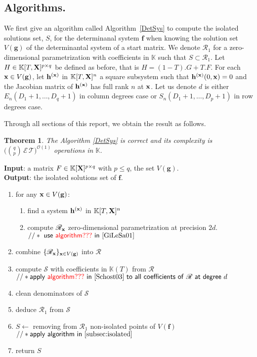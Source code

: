 \documentclass[11pt]{article}
\numberwithin{Property}{section}
\newtheorem{Theorem}{Theorem}%
\numberwithin{Theorem}{section}
\numberwithin{Proposition}{section}
\numberwithin{Lemma}{section}
\numberwithin{Corollary}{section}
\numberwithin{Definition}{section}
\numberwithin{Remark}{section}
\numberwithin{Conjecture}{section}
\numberwithin{Problem}{section}
\numberwithin{Claim}{section}
\theoremstyle{definition}
\numberwithin{Example}{section}
\def\f {\ensuremath{\mathbf{f}}}
\def\h {\ensuremath{\mathbf{h}}}
\def\g {\ensuremath{\mathbf{g}}}
\renewcommand{\leq}{\leqslant}
\newcommand{\bigO}[1]{\mathcal{O}(#1)} %
\newcommand{\field}{\mathbb{K}} %
\newcommand{\mat}[1]{\mathbf{\MakeUppercase{#1}}} %
\newcommand{\todo}[1]{\textcolor{red}{#1}} %
\begin{document}
\subsection{Algorithms.} We first give an algorithm called Algorithm~\ref{DetSys} to compute the isolated solutions set, $S$,  for the determinanal system $\f$ when knowing the solution set $V(\g)$ of the determinantal system of a start matrix. We denote $\mathscr{R}_{1}$ for a zero-dimensional parametrization with coefficients in $\field$ such that $S \subset \mathscr{R}_{1}$. Let $H \in \field[T, \mat{X}]^{p \times q}$ be defined as before, that is $H = (1 - T).G + T.F$. For each ${\bf x} \in V(\g)$, let $\h^{(\bf x)}$ in $\field[T,\mat{X}]^n$ a square subsystem such that $\h^{(\bf x)}(0,{\bf x}) = 0$ and the Jacobian matrix of $\h^{(\bf x)}$ has full rank $n$ at ${\bf x}$. Let us denote $d$ is either $E_{n}(D_1+1, \ldots, D_q+1)$ in column degrees case or $S_{n}(D_1+1, \ldots, D_p+1)$ in row degrees case. 

Through all sections of this report, we obtain the result as follows.
\begin{Theorem}
The Algorithm \ref{DetSys} is correct and its complexity is $\big({{q}\choose{p}} \,\mathcal{E}\,\mathcal{T}\big)^{\bigO{1}}$ operations in $\field$.
\end{Theorem}
\begin{algorithm}
\caption{$\mathsf{Determinantal System}$}
\label{DetSys}
{\bf Input}: a matrix $F \in \field[\mat{X}]^{p \times q}$ with $p \leq q$, the set $V(\g)$.\\
{\bf Output}: the isolated solutions set of $\f$. 
\begin{enumerate}
\item for any ${\bf x} \in V(\g)$: 
\begin{enumerate}
\item find a system $\h^{(\bf x)}$ in $\field[T,\mat{X}]^n$
\item compute $\mathscr{R}_{\bf x}$ zero-dimensional parametrization at precision $2d$. \\
$\mathsf{//* \ use \ \todo{algorithm???} \ in~\cite{GiLeSa01} \ }$
\end{enumerate}
\item combine $\{\mathscr{R}_{\bf x}\}_{{\bf x} \in V(\g)}$ into $\mathscr{R}$
\item compute $\mathscr{S}$ with coefficients in $\field(T)$ from  $\mathscr{R}$\\
$\mathsf{//* apply \ \todo{algorithm???} \ in~\cite{Schost03} \ to \ all \ coefficients \ of \ \mathscr{R} \ at \ degree} \ d$
\item clean denominators of $\mathscr{S}$
\item deduce $\mathscr{R}_{1}$ from $\mathscr{S}$
\item  $S \gets$ removing from $\mathscr{R}_{1}$ non-isolated points of $V(\f)$\\
$\mathsf{//* apply \ algorithm \ in~\cref{subsec:isolated}}$
\item return $S$
\end{enumerate}
\end{algorithm}
 
\end{document}

